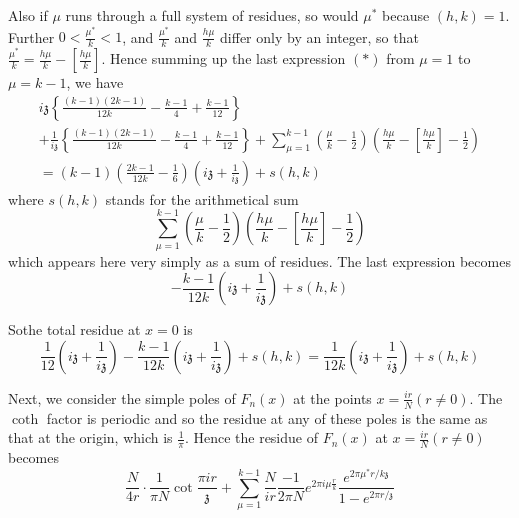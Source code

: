 Also if $\mu$ runs through a full system of residues, so would $\mu^*$
because $(h, k)=1$. Further $0 < \frac{\mu^*}{k}<1$, and
$\frac{\mu^*}{k}$ and $\frac{h \mu}{k}$ differ only by an integer, so
that $\frac{\mu^*}{k} = \frac{h \mu}{k} - \left[ \frac{h
    \mu}{k}\right]$. Hence summing up the last expression $(*)$ from
$\mu=1$ to $\mu=k-1$, we have
\begin{multline*}
  i \mathfrak{z}  \left\{ \frac{(k-1)(2k-1)}{12k} - \frac{k-1}{4} +
  \frac{k-1}{12} \right\}\\ 
  + \frac{1}{i \mathfrak{z}} \left\{
  \frac{(k-1)(2k-1)}{12k} - \frac{k-1}{4} + \frac{k-1}{12} \right\}
  + \sum^{k-1}_{\mu=1} \left( \frac{\mu}{k}- \frac{1}{2}\right)
  \left( \frac{h \mu}{k} - \left[ \frac{h \mu}{k}\right]-
  \frac{1}{2}\right)\\ 
  = (k-1) \left( \frac{2k-1}{12k} -
  \frac{1}{6}\right) \left(i \mathfrak{z} + \frac{1}{i \mathfrak{z}}
  \right) + s(h, k)
\end{multline*}
where $s(h, k)$ stands for the arithmetical sum 
$$
\sum^{k-1}_{\mu=1} \left( \frac{\mu}{k} - \frac{1}{2}\right) \left(
\frac{h \mu}{k} - \left[ \frac{h \mu}{k}\right]- \frac{1}{2}\right)
$$
which appears here very simply as a sum of residues. The last expression becomes
$$
- \frac{k-1}{12k} \left( i \mathfrak{z} + \frac{1}{i
  \mathfrak{z}}\right) + s (h, k)
$$

So\pageoriginale the total residue at $x=0$ is 
$$
\frac{1}{12} \left( i \mathfrak{z} + \frac{1}{i \mathfrak{z}}\right) -
\frac{k-1}{12k} \left( i \mathfrak{z} + \frac{1}{i\mathfrak{z}}\right) + s(h,
k) = \frac{1}{12k} \left( i\mathfrak{z}
+\frac{1}{i\mathfrak{z}}\right) + s(h, k)
$$

Next, we consider the simple poles of $F_n (x)$ at the points $x=
\frac{i r}{N} (r \neq 0)$. The $\coth$ factor is periodic and so the
residue at any of these poles is the same as that at the origin, which
is $\frac{1}{\pi}$. Hence  the residue of $F_n (x)$ at $x= \frac{i
  r}{N} (r \neq 0)$ becomes 
$$
\frac{N}{4r} \cdot \frac{1}{ \pi N} \cot \frac{\pi i r}{\mathfrak{z}}
+ \sum^{k-1}_{\mu=1}  \frac{N}{i r} \frac{-1}{2 \pi N} e^{2 \pi i \mu
\frac{r}{k}} \frac{e^{2 \pi \mu^* r/k\mathfrak{z}}}{1- e^{2 \pi r/\mathfrak{z}}}
$$


